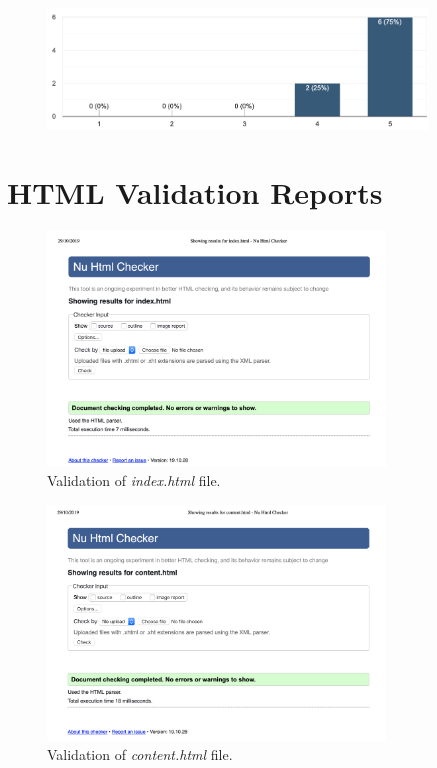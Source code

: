 \documentclass[letterpaper,12pt]{article}
\begin{document}
\begin{appendices}
\begin{figure}[h] 
\centerline{\includegraphics[width=0.9\textwidth]{report/images/user-survey-responsiveness.png}}
{\label{fig:user-survey-responsiveness}}
\end{figure}

\clearpage
\section{HTML Validation Reports}
\label{sec:appendix-validation-reports}

\begin{figure}[h] 
\centerline{\includegraphics[width=0.8\textwidth]{report/images/validation-index.png}}
\caption{\label{fig:validation-index}Validation of \textit{index.html} file.}
\end{figure}

\begin{figure}[h] 
\centerline{\includegraphics[width=0.8\textwidth]{report/images/validation-content.png}}
\caption{\label{fig:validation-content.png}Validation of \textit{content.html} file.}
\end{figure}


\end{appendices}
\end{document}
